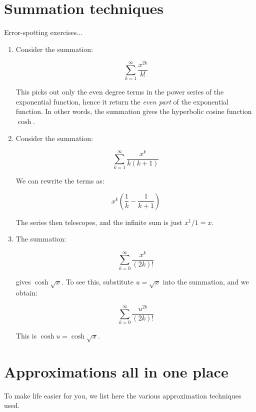 \documentclass[10pt]{amsart}
\begin{document}
\section{Summation techniques}

Error-spotting exercises...

\begin{enumerate}
\item Consider the summation:

  $$\sum_{k=1}^\infty \frac{x^{2k}}{k!}$$

  This picks out only the even degree terms in the power series of the
  exponential function, hence it return the {\em even part} of the
  exponential function. In other words, the summation gives the
  hyperbolic cosine function $\cosh$.
\item Consider the summation:

  $$\sum_{k=1}^\infty \frac{x^k}{k(k+1)}$$

  We can rewrite the terms as:

  $$x^k\left(\frac{1}{k} - \frac{1}{k + 1}\right)$$

  The series then telescopes, and the infinite sum is just $x^1/1 = x$.

\item The summation:

  $$\sum_{k=0}^\infty \frac{x^k}{(2k)!}$$

  gives $\cosh \sqrt{x}$. To see this, substitute $u = \sqrt{x}$ into
  the summation, and we obtain:

  $$\sum_{k=0}^\infty \frac{u^{2k}}{(2k)!}$$

  This is $\cosh u = \cosh \sqrt{x}$.
\end{enumerate}

\section{Approximations all in one place}

To make life easier for you, we list here the various approximation
techniques used.
\end{document}
